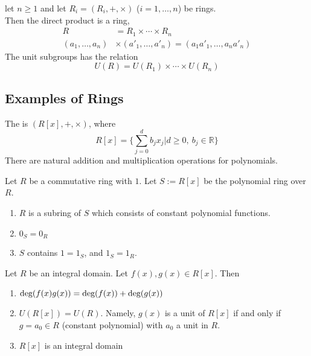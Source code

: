 \begin{remark}
 let $n \geq 1$ and let $R_i = (R_i, +, \times)$ ($i=1, \ldots, n$) be rings.\\
Then the direct product is a ring, 
\begin{align}
R &= R_1 \times \cdots \times R_n \nonumber \\
(a_1, \ldots, a_n) &\times (a'_1, \ldots, a'_n) = (a_1 a'_1, \ldots, a_n a'_n) \nonumber
\end{align}
The unit subgroups has the relation 
\begin{equation}
U(R) = U(R_1)\times \cdots \times U(R_n) \nonumber
\end{equation}
\end{remark}


\subsection{Examples of Rings}

\begin{definition}
The  is $(R[x], +, \times)$,  where 
\begin{equation}
R[x] = \{\sum_{j=0}^{d} b_j x_j | d \geq 0, \ b_j \in \mathbb{R} \} \nonumber
\end{equation}
There are natural addition and multiplication operations for polynomials.\\
\end{definition}


\begin{remark}
Let $R$ be a commutative ring with $1$. Let $S:= R[x]$ be the polynomial ring over $R$.
\begin{enumerate}[label=(\roman*)]
\item $R$ is a subring of $S$ which consists of constant polynomial functions.
\item $0_S = 0_R$
\item $S$ contains $1=1_S$, and $1_S = 1_R$.
\end{enumerate}
\end{remark}


\begin{proposition}
 Let $R$ be an integral domain. Let $f(x), g(x) \in R[x]$. Then
\begin{enumerate}[label=(\roman*)]
\item $\textnormal{deg}(f(x)g(x)) = \textnormal{deg}(f(x)) + \textnormal{deg}(g(x))$
\item $U(R[x]) = U(R)$. Namely, $g(x)$ is a unit of $R[x]$ if and only if $g=a_0 \in R$ (constant polynomial) with $a_0$ a unit in $R$.
\item $R[x]$ is an integral domain
\end{enumerate}
\end{proposition}


